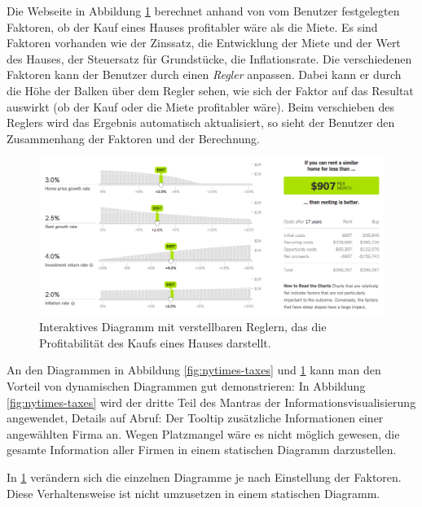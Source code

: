 Die Webseite in Abbildung \ref{fig:nytimes-realestate} berechnet anhand von vom Benutzer festgelegten Faktoren, ob der Kauf eines Hauses profitabler wäre als die Miete. Es sind Faktoren vorhanden wie der Zinssatz, die Entwicklung der Miete und der Wert des Hauses, der Steuersatz für Grundstücke, die Inflationsrate. Die verschiedenen Faktoren kann der Benutzer durch einen \textit{Regler} anpassen. Dabei kann er durch die Höhe der Balken über dem Regler sehen, wie sich der Faktor auf das Resultat auswirkt (ob der Kauf oder die Miete profitabler wäre). Beim verschieben des Reglers wird das Ergebnis automatisch aktualisiert, so sieht der Benutzer den Zusammenhang der Faktoren und der Berechnung.

\begin{figure}[!htbp]
	\centering
	\includegraphics[width=\linewidth]{images/nytimes-realestate-zugeschnitten}
	\caption[Interaktives Diagramm in The New York Times]{Interaktives Diagramm mit verstellbaren Reglern, das die Profitabilität des Kaufs eines Hauses darstellt. \cite{nytimes-realestate}}
	\label{fig:nytimes-realestate}
\end{figure}


An den Diagrammen in Abbildung \ref{fig:nytimes-taxes} und \ref{fig:nytimes-realestate} kann man den Vorteil von dynamischen Diagrammen gut demonstrieren: In Abbildung \ref{fig:nytimes-taxes} wird der dritte Teil des Mantras der Informationsvisualisierung angewendet, Details auf Abruf: Der Tooltip zusätzliche Informationen einer angewählten Firma an. Wegen Platzmangel wäre es nicht möglich gewesen, die gesamte Information aller Firmen in einem statischen Diagramm darzustellen.

In \ref{fig:nytimes-realestate} verändern sich die einzelnen Diagramme je nach Einstellung der Faktoren. Diese Verhaltensweise ist nicht umzusetzen in einem statischen Diagramm.

